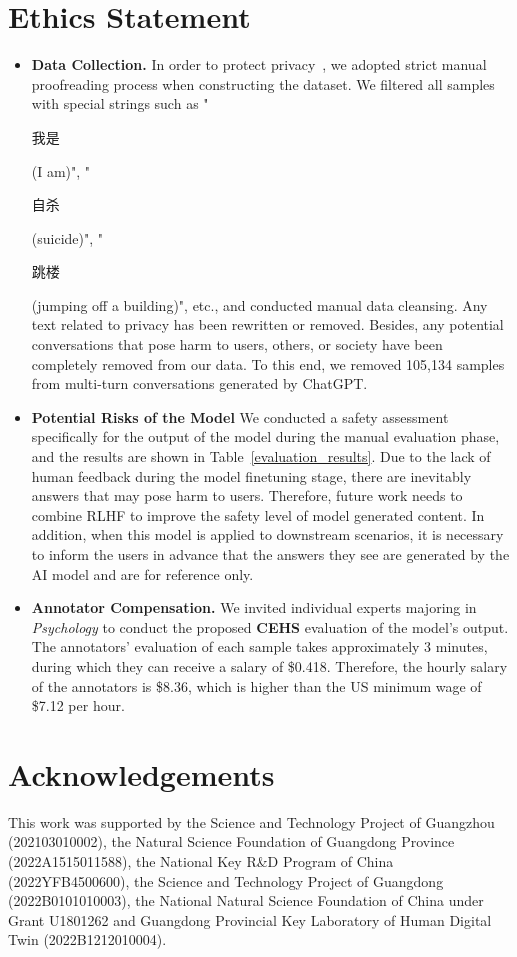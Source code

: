 \documentclass[11pt]{article}
\begin{document}
\section*{Ethics Statement}
\begin{itemize}
  \item
  \textbf{Data Collection.} In order to protect privacy~\citep{hovy-spruit-2016-social}, we adopted strict manual proofreading process when constructing the dataset. We filtered all samples with special strings such as "\begin{CJK}{UTF8}{gbsn}我是\end{CJK} (I am)", "\begin{CJK}{UTF8}{gbsn}自杀\end{CJK} (suicide)", "\begin{CJK}{UTF8}{gbsn}跳楼\end{CJK} (jumping off a building)", etc., and conducted manual data cleansing. Any text related to privacy has been rewritten or removed. Besides, any potential conversations that pose harm to users, others, or society have been completely removed from our data. To this end, we removed 105,134 samples from multi-turn conversations generated by ChatGPT.
  \item
  \textbf{Potential Risks of the Model} We conducted a safety assessment specifically for the output of the model during the manual evaluation phase, and the results are shown in Table~\ref{evaluation_results}. Due to the lack of human feedback during the model finetuning stage, there are inevitably answers that may pose harm to users. Therefore, future work needs to combine RLHF to improve the safety level of model generated content. In addition, when this model is applied to downstream scenarios, it is necessary to inform the users in advance that the answers they see are generated by the AI model and are for reference only.
  \item
  \textbf{Annotator Compensation.} We invited individual experts majoring in \textit{Psychology} to conduct the proposed \textbf{CEHS} evaluation of the model's output. The annotators' evaluation of each sample takes approximately 3 minutes, during which they can receive a salary of \$0.418. Therefore, the hourly salary of the annotators is \$8.36, which is higher than the US minimum wage of \$7.12 per hour.
\end{itemize}


\section*{Acknowledgements}
This work was supported by the Science and Technology Project of Guangzhou (202103010002), the Natural Science Foundation of Guangdong Province (2022A1515011588), the National Key R\&D Program of China (2022YFB4500600), the Science and Technology Project of Guangdong (2022B0101010003), the National Natural Science Foundation of China under Grant U1801262 and Guangdong Provincial Key Laboratory of  Human Digital Twin (2022B1212010004).
\end{document}

